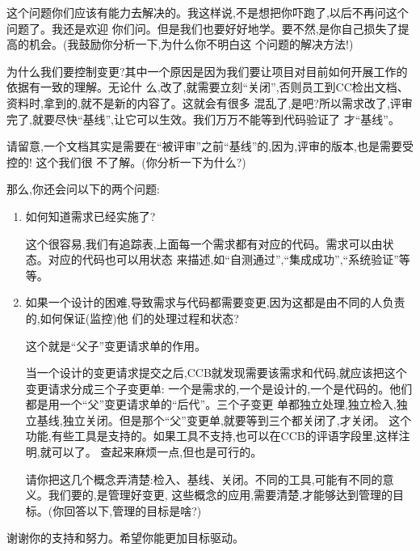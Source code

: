 \documentclass[11pt]{article}
\begin{document}
\begin{yang}

  \ylogo 这个问题你们应该有能力去解决的。我这样说,不是想把你吓跑了,以后不再问这个问题了。我还是欢迎
  你们问。但是我们也要好好地学。要不然,是你自己损失了提高的机会。(我鼓励你分析一下,为什么你不明白这
  个问题的解决方法!)

  为什么我们要控制变更?其中一个原因是因为我们要让项目对目前如何开展工作的依据有一致的理解。无论什
  么,改了,就需要立刻``关闭'',否则员工到CC检出文档、资料时,拿到的,就不是新的内容了。这就会有很多
  混乱了,是吧?所以需求改了,评审完了,就要尽快``基线'',让它可以生效。我们万万不能等到代码验证了
  才``基线''。

  请留意,一个文档其实是需要在``被评审''之前``基线''的,因为,评审的版本,也是需要受控的! 这个我们很
  不了解。(你分析一下为什么?)

   那么,你还会问以下的两个问题:
\begin{enumerate}
    \item 如何知道需求已经实施了?

      这个很容易,我们有追踪表,上面每一个需求都有对应的代码。需求可以由状态。对应的代码也可以用状态
      来描述,如``自测通过'',``集成成功'',``系统验证''等等。
    \item 如果一个设计的困难,导致需求与代码都需要变更,因为这都是由不同的人负责的,如何保证(监控)他
      们的处理过程和状态? 

      这个就是``父子''变更请求单的作用。

      当一个设计的变更请求提交之后,CCB就发现需要该需求和代码,就应该把这个变更请求分成三个子变更单:
      一个是需求的,一个是设计的,一个是代码的。他们都是用一个``父''变更请求单的``后代''。三个子变更
      单都独立处理,独立检入,独立基线,独立关闭。但是那个``父''变更单,就要等到三个都关闭了,才关闭。
      这个功能,有些工具是支持的。如果工具不支持,也可以在CCB的评语字段里,这样注明,就可以了。
      查起来麻烦一点,但也是可行的。

      请你把这几个概念弄清楚:检入、基线、关闭。不同的工具,可能有不同的意义。我们要的,是管理好变更,
      这些概念的应用,需要清楚,才能够达到管理的目标。(你回答以下,管理的目标是啥?)
\end{enumerate}

谢谢你的支持和努力。希望你能更加目标驱动。
\end{yang}
\end{document}
